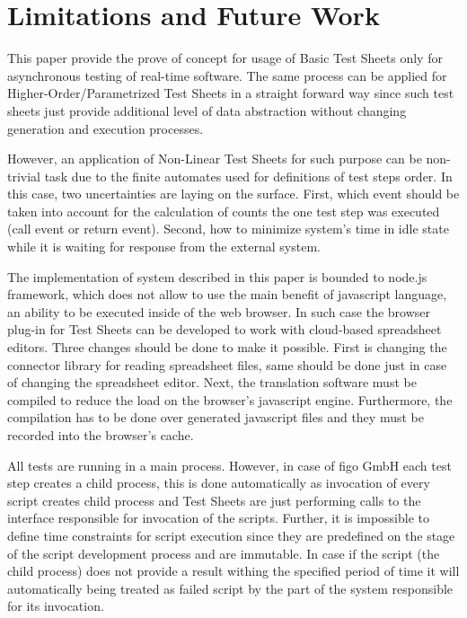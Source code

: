 

\chapter{Limitations and Future Work}
\label{chap:limits}
This paper provide the  prove of concept for usage of Basic Test Sheets only for asynchronous testing of real-time software. The same process can be applied for Higher-Order/Parametrized Test Sheets in a straight forward way since such test sheets just provide additional level of data abstraction without changing generation and execution processes.

However, an application of Non-Linear Test Sheets for such purpose can be non-trivial task due to the finite automates used for definitions of test steps order. In this case, two uncertainties are laying on the surface. First, which event should be taken into account for the calculation of counts the one test step was executed (call event or return event). Second, how to minimize system's time in idle state while it is waiting for response from the external system.
 
The implementation  of system described in this paper is bounded to node.js framework, which does not allow to use the  main benefit of javascript language, an ability to be executed inside of the web browser. In such case the browser plug-in for Test Sheets can be developed to work with cloud-based spreadsheet editors. Three changes should be done to make it possible. First is changing the connector library for reading spreadsheet files, same should be done just in case of changing the spreadsheet editor. Next, the  translation software must be compiled to reduce the load on the browser's javascript engine. Furthermore, the compilation has to be done over generated javascript files and they must be recorded into the browser's cache.

All tests are running in a main process. However, in case of figo GmbH each test step creates a child process, this is done automatically as invocation of every script creates child process and Test Sheets are just performing calls to the interface responsible for invocation of the scripts. Further, it is impossible to define time constraints for script execution since they are predefined on the stage of the script development process and are immutable. In case if the script (the child process) does not provide a result withing the specified period of time it will automatically being treated as failed script by the part of the system responsible for its invocation.

